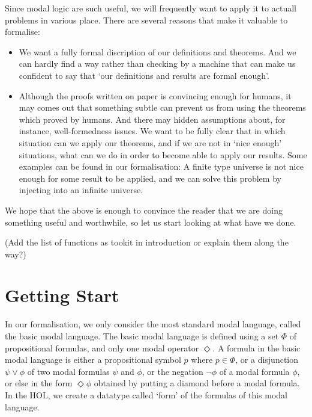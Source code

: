 \documentclass[letterpaper]{article}
\begin{document}
Since modal logic are such useful, we will frequently want to apply it to actuall problems in various place. There are several reasons that make it valuable to formalise:

\begin{itemize}

\item We want a fully formal discription of our definitions and theorems. And we can hardly find a way rather than checking by a machine that can make us confident to say that `our definitions and results are formal enough'. 


\item Although the proofs written on paper is convincing enough for humans, it may comes out that something subtle can prevent us from using the theorems which proved by humans. And there may hidden assumptions about, for instance, well-formedness issues. We want to be fully clear that in which situation can we apply our theorems, and if we are not in `nice enough' situations, what can we do in order to become able to apply our results. Some examples can be found in our formalisation: A finite type universe is not nice enough for some result to be applied, and we can solve this problem by injecting into an infinite universe. 

\end{itemize}


We hope that the above is enough to convince the reader that we are doing something useful and worthwhile, so let us start looking at what have we done. 

(Add the list of functions as tookit in introduction or explain them along the way?)

\section{Getting Start}

In our formalisation, we only consider the most standard modal language, called the basic modal language. The basic modal language is defined using a set $\Phi$ of propositional formulas, and only one modal operator $\Diamond$. A formula in the basic modal language is either a propositional symbol $p$ where $p\in \Phi$, or a disjunction $\psi\lor\phi$  of two modal formulas $\psi$ and $\phi$, or the negation $\lnot \phi$ of a modal formula $\phi$, or else in the form $\Diamond \phi$ obtained by putting a diamond before a modal formula. In the HOL, we create a datatype called `form' of the formulas of this modal language. 
\end{document}
